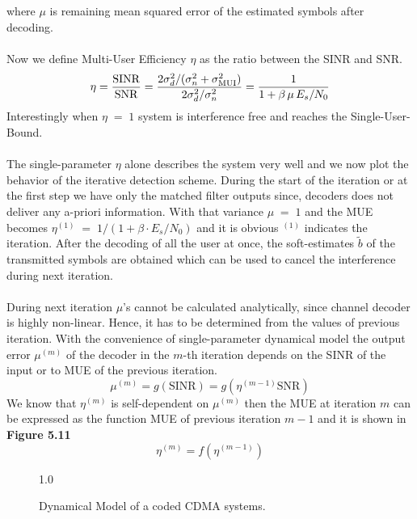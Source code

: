 where $\mu$ is remaining mean squared error of the estimated symbols after decoding.\\ \\
Now we define Multi-User Efficiency $\eta$ as the ratio between the SINR and SNR.
\begin{equation}
\eta=\frac{\hbox{$\mathrm{SINR}$}}{\hbox{$\mathrm{SNR}$}}=\frac{\hbox{$2\sigma_d^2/(\sigma_n^2+\sigma_{\textrm{MUI}}^2)$}}{\hbox{$2\sigma_d^2/\sigma_n^2$}}=\frac{\hbox{$1$}}{\hbox{$1+\beta\,\mu\,E_s/N_0$}}
\end{equation}
Interestingly when $\eta\;=\;1$ system is interference free and reaches the Single-User-Bound. \\ \\
The single-parameter $\eta$ alone describes the system very well and we now plot the behavior of the iterative detection scheme. During the start of the iteration or at the first step we have only the matched filter outputs since, decoders does not deliver any a-priori information. With that variance $\mu\;=\;1$ and the MUE becomes $\eta^{(1)}\;=\;1/(1+\beta\cdot E_s/N_0)$ and it is obvious $^{(1)}$ indicates the iteration. After the decoding of all the user at once, the soft-estimates $\tilde{b}$ of the transmitted symbols are obtained which can be used to cancel the interference during next iteration. \\ \\
During next iteration $\mu$'s cannot be calculated analytically, since channel decoder is highly non-linear. Hence, it has to be determined from the values of previous iteration. With the convenience of single-parameter dynamical model the output error $\mu^{(m)}$ of the decoder in the $m$-th iteration depends on the SINR of the input or to MUE of the previous iteration.
\begin{equation}
\mu^{(m)}=g(\mathrm{SINR})=g\left(\eta^{(m-1)}\mathrm{SNR}\right)
\end{equation}
We know that $\eta^{(m)}$ is self-dependent on $\mu^{(m)}$ then the MUE at iteration $m$ can be expressed as the function MUE of previous iteration $m-1$ and it is shown in \textbf{Figure 5.11} 
\begin{equation}
\eta^{(m)}=f\left(\eta^{(m-1)}\right)
\end{equation}
\begin{figure}[htb]
\centerline{  {1.0} }
\caption{Dynamical Model of a coded CDMA systems.}
\end{figure}\\
